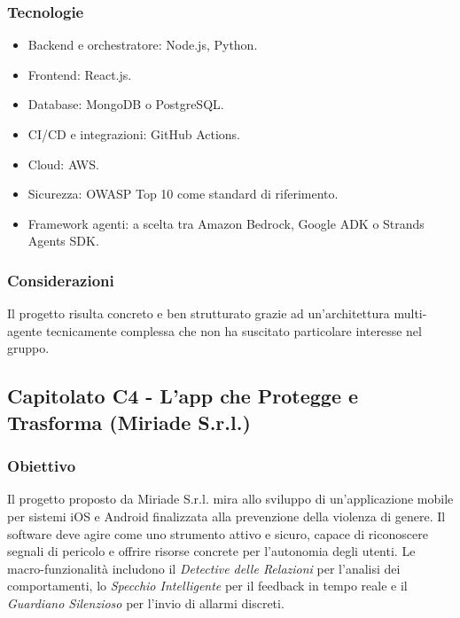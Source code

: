 \documentclass[a4paper, 10pt, colorlinks=true, linkcolor=black, urlcolor=blue, citecolor=blue, hidelinks]{article}
\begin{document}
\subsubsection{Tecnologie}
\begin{itemize}
    \item Backend e orchestratore: Node.js, Python.
    \item Frontend: React.js.
    \item Database: MongoDB o PostgreSQL.
    \item CI/CD e integrazioni: GitHub Actions.
    \item Cloud: AWS.
    \item Sicurezza: OWASP Top 10 come standard di riferimento.
    \item Framework agenti: a scelta tra Amazon Bedrock, Google ADK o Strands Agents SDK.
\end{itemize}

\subsubsection{Considerazioni}
Il progetto risulta concreto e ben strutturato grazie ad un’architettura multi-agente tecnicamente complessa che non ha suscitato particolare interesse nel gruppo.
\subsection{Capitolato C4 - L'app che Protegge e Trasforma (Miriade S.r.l.)}

\subsubsection{Obiettivo}
Il progetto proposto da Miriade S.r.l. mira allo sviluppo di un'applicazione mobile per sistemi iOS e Android finalizzata alla prevenzione della violenza di genere. Il software deve agire come uno strumento attivo e sicuro, capace di riconoscere segnali di pericolo e offrire risorse concrete per l'autonomia degli utenti. Le macro-funzionalità includono il \textit{Detective delle Relazioni} per l'analisi dei comportamenti, lo \textit{Specchio Intelligente} per il feedback in tempo reale e il \textit{Guardiano Silenzioso} per l'invio di allarmi discreti.
\end{document}
